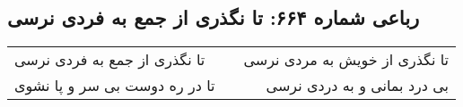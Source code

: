 \begin{center}
\section*{رباعی شماره ۶۶۴: تا نگذری از جمع به فردی نرسی}
\label{sec:sh664}
\begin{longtable}{l p{0.5cm} r}
تا نگذری از جمع به فردی نرسی
&&
تا نگذری از خویش به مردی نرسی
\\
تا در ره دوست بی سر و پا نشوی
&&
بی درد بمانی و به دردی نرسی
\\
\end{longtable}
\end{center}
